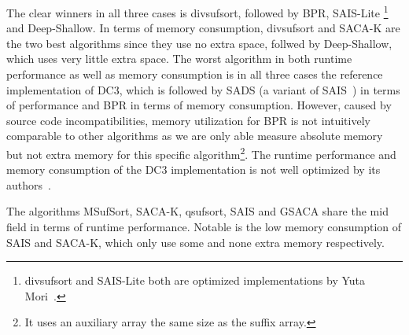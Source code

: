 The clear winners in all three cases is divsufsort, followed by BPR, SAIS-Lite
\footnote{divsufsort and SAIS-Lite both are optimized implementations by Yuta Mori~\cite{saca:5}.} and Deep-Shallow.
In terms of memory consumption, divsufsort and SACA-K are the two best algorithms since they use no extra space,
follwed by Deep-Shallow, which uses very little extra space.
The worst algorithm in both runtime performance as well as memory consumption is in all three cases the reference implementation of DC3,
which is followed by SADS (a variant of SAIS~\cite{saca:6}) in terms of performance and BPR in terms of memory consumption.
However, caused by source code incompatibilities,
memory utilization for BPR is not intuitively comparable to other algorithms as we are only able measure absolute memory
but not extra memory for this specific algorithm\footnote{It uses an auxiliary array the same size as the suffix array.}.
The runtime performance and memory consumption of the DC3 implementation is not well optimized by its authors~\cite{saca:9}.

The algorithms MSufSort, SACA-K, qsufsort, SAIS and GSACA share the mid field in terms of runtime performance.
Notable is the low memory consumption of SAIS and SACA-K, which only use some and none extra memory respectively.



